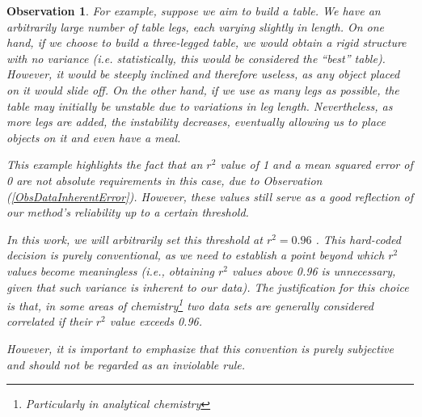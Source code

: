 \documentclass[12pt,letterpaper]{article}
\newtheorem{observation}{Observation}
\begin{document}
\begin{multicols}{2}
\begin{observation}
For example, suppose we aim to build a table. We have an arbitrarily large number of table legs, each varying slightly in length. On one hand, if we choose to build a three-legged table, we would obtain a rigid structure with no variance (i.e. statistically, this would be considered the “best” table). However, it would be steeply inclined and therefore useless, as any object placed on it would slide off. On the other hand, if we use as many legs as possible, the table may initially be unstable due to variations in leg length. Nevertheless, as more legs are added, the instability decreases, eventually allowing us to place objects on it and even have a meal.

This example highlights the fact that an  $r^2$  value of 1 and a mean squared error of 0 are not absolute requirements in this case, due to Observation (\ref{ObsDataInherentError}). However, these values still serve as a good reflection of our method’s reliability up to a certain threshold.

In this work, we will arbitrarily set this threshold at  $r^2 = 0.96$ . This hard-coded decision is purely conventional, as we need to establish a point beyond which  $r^2$  values become meaningless (i.e., obtaining  $r^2$  values above 0.96 is unnecessary, given that such variance is inherent to our data). The justification for this choice is that, in some areas of chemistry\footnote{Particularly in analytical chemistry} two data sets are generally considered correlated if their  $r^2$  value exceeds 0.96.

However, it is important to emphasize that this convention is purely subjective and should not be regarded as an inviolable rule.


\end{observation}


\end{multicols}

\newpage

\end{document}
